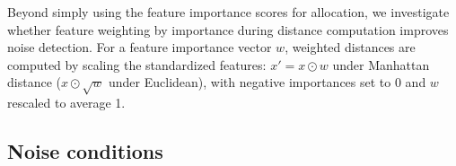 Beyond simply using the feature importance scores for allocation, we investigate whether feature weighting by importance during distance computation improves noise detection. For a feature importance vector $w$, weighted distances are computed by scaling the standardized features: $x' = x \odot w$ under Manhattan distance ($x \odot \sqrt{w}$ under Euclidean), with negative importances set to 0 and $w$ rescaled to average 1. 


\subsection{Noise conditions}
